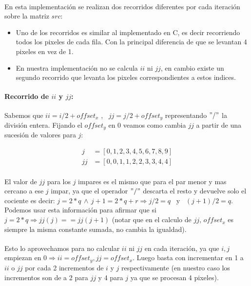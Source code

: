 \documentclass[a4paper]{article}
\begin{document}
\paragraph{} En esta implementaci\'on se realizan dos recorridos diferentes por cada iteraci\'on sobre la matriz $src$: 
\begin{itemize}
	\item Uno de los recorridos es similar al implementado en C, es decir recorriendo todos los pixeles de cada fila. Con la principal diferencia de que se levantan 4 pixeles en vez de 1.
	\item En nuestra implementaci\'on no se calcula $ii$ ni $jj$, en cambio existe un segundo recorrido que levanta los pixeles correspondientes a estos indices.
\end{itemize}

\paragraph{Recorrido de $ii$ y $jj$:} 
\begin{center}
	Sabemos que $ii = i/2 + offset_x$ , \, $jj = j/2 + offset_y$ representando $"/"$ la divisi\'on entera. Fijando el $offset_y$ en 0 veamos como cambia $jj$ a partir de una sucesi\'on de valores para $j$:
	
	\begin{align*}
		j &= [0, 1, 2, 3, 4, 5, 6, 7, 8, 9]\\
		jj &= [0, 0, 1, 1, 2, 2, 3, 3, 4, 4]
	\end{align*}    
	
	\paragraph{} El valor de $jj$ para los $j$ impares es el mismo que para el par menor y mas cercano a ese $j$ impar, ya que el operador $"/"$ descarta el resto y devuelve solo el cociente es decir: $j = 2*q \, \wedge \, j+1 = 2*q + r \Rightarrow j/2 = q$ \, y \, $(j+1)/2 = q$. Podemos usar esta informaci\'on para afirmar que si $j = 2 * q \Rightarrow jj(j) == jj(j+1)$ (notar que en el calculo de $jj$, $offset_x$ es siempre la misma constante sumada, no cambia la igualdad).
	
	\paragraph{} Esto lo aprovechamos para no calcular $ii$ ni $jj$ en cada iteraci\'on, ya que $i, j$ empiezan en $0 \Rightarrow ii = offset_y, jj=offset_x$. Luego basta con incrementar en 1 a $ii$ o $jj$ por cada 2 incrementos de $i$ y $j$ respectivamente (en nuestro caso los incrementos son de a 2 para $jj$ y 4 para $j$ ya que se procesan 4 pixeles).
\end{center}
\end{document}
